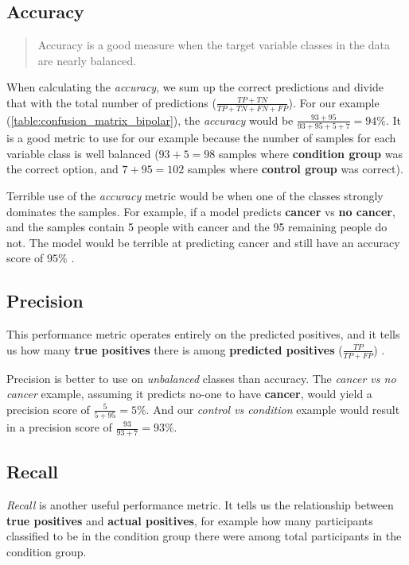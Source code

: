 \subsection{Accuracy}

\blockquote[\cite{ml_metrics}]{Accuracy is a good measure when the target variable classes in the data are nearly balanced.}

When calculating the \textit{accuracy}, we sum up the correct predictions and divide that with the total number of predictions 
($ \frac{TP + TN}{TP + TN + FN + FP} $).
For our example (\ref{table:confusion_matrix_bipolar}), the \textit{accuracy} would be 
$ \frac{93 + 95}{93 + 95 + 5 + 7} = 94\% $. 
It is a good metric to use for our example because the number of samples for each variable class is well balanced 
($ 93+5=98 $ samples where \textbf{condition group} was the correct option, and $ 7+95=102 $ samples where \textbf{control group} was correct).

Terrible use of the \textit{accuracy} metric would be when one of the classes strongly dominates the samples. 
For example, if a model predicts \textbf{cancer} vs \textbf{no cancer}, and the samples contain 5 people with cancer and 
the 95 remaining people do not. The model would be terrible at predicting cancer and still have an accuracy score of $ 95\% $ \cite{ml_metrics}.

\subsection{Precision} 

This performance metric operates entirely on the predicted positives, and it tells us how many \textbf{true positives} there is among 
\textbf{predicted positives} ($ \frac{TP}{TP + FP} $) \cite{ml_metrics}. 

Precision is better to use on \textit{unbalanced} classes than accuracy. The \textit{cancer vs no cancer} example, assuming it 
predicts no-one to have \textbf{cancer}, would yield a precision score of $ \frac{5}{5+95} = 5\% $. And our \textit{control vs condition} example
would result in a precision score of $ \frac{93}{93+7} = 93\% $.

\subsection{Recall}

\textit{Recall} is another useful performance metric. It tells us the relationship between \textbf{true positives} and \textbf{actual positives},
for example how many participants classified to be in the condition group there were among total participants in the condition group.

